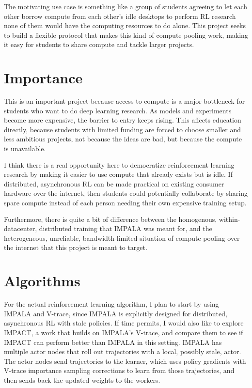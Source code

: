 \documentclass{article}
\begin{document}
The motivating use case is something like a group of students agreeing to let each other borrow compute
from each other's idle desktops to perform RL research none of them would have the computing resources to
do alone. This project seeks to build a flexible protocol that makes this kind of compute pooling work,
making it easy for students to share compute and tackle larger projects.


\section{Importance}
This is an important project because access to compute is a major bottleneck for students who want to do
deep learning research. As models and experiments become more expensive, the barrier to entry keeps rising.
This affects education directly, because students with limited funding are forced to choose smaller and less
ambitious projects, not because the ideas are bad, but because the compute is unavailable.

I think there is a real opportunity here to democratize reinforcement learning research by making it easier
to use compute that already exists but is idle. If distributed, asynchronous RL can be made practical on
existing consumer hardware over the internet, then students could potentially collaborate by
sharing spare compute instead of each person needing their own expensive training setup.

Furthermore, there is quite a bit of difference between the homogenous, within-datacenter, distributed
training that IMPALA was meant for, and the heterogeneous, unreliable, bandwidth-limited situation of
compute pooling over the internet that this project is meant to target.


\section{Algorithms}
For the actual reinforcement learning algorithm, I plan to start by using IMPALA and V-trace, since
IMPALA is explicitly designed for distributed, asynchronous RL with stale policies.
If time permits, I would also like to explore IMPACT, a work that builds on IMPALA's V-trace, and compare them
to see if IMPACT can perform better than IMPALA in this setting. IMPALA has multiple actor nodes that roll out
trajectories with a local, possibly stale, actor. The actor nodes send trajectories to the learner, which
uses policy gradients with V-trace importance sampling corrections to learn from those trajectories, and then
sends back the updated weights to the workers.
\end{document}

